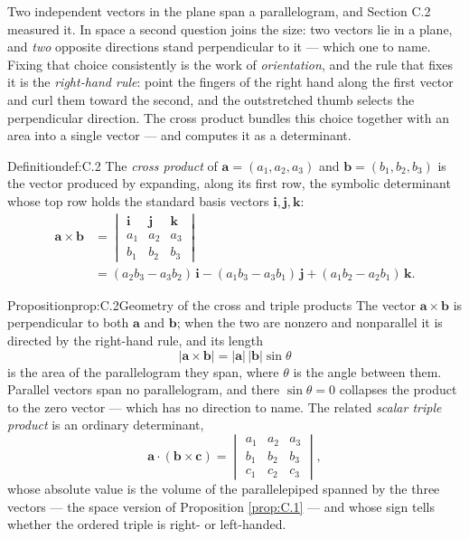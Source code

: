 \documentclass[a4paper,12pt,oneside]{memoir}
\begin{document}
Two independent vectors in the plane span a parallelogram, and Section C.2 measured it. In space a second question joins the size: two vectors lie in a plane, and \emph{two} opposite directions stand perpendicular to it — which one to name. Fixing that choice consistently is the work of \emph{orientation}, and the rule that fixes it is the \emph{right-hand rule}: point the fingers of the right hand along the first vector and curl them toward the second, and the outstretched thumb selects the perpendicular direction. The cross product bundles this choice together with an area into a single vector — and computes it as a determinant.

\begin{envdefinition}{Definition}{def:C.2}{}
The \emph{cross product} of \(\mathbf{a} = (a_1, a_2, a_3)\) and \(\mathbf{b} = (b_1, b_2, b_3)\) is the vector produced by expanding, along its first row, the symbolic determinant whose top row holds the standard basis vectors \(\mathbf{i}, \mathbf{j}, \mathbf{k}\): \[ \begin{aligned}
        \mathbf{a} \times \mathbf{b}
          &= \begin{vmatrix} \mathbf{i} & \mathbf{j} & \mathbf{k} \\ a_1 & a_2 & a_3 \\ b_1 & b_2 & b_3 \end{vmatrix} \\[2pt]
          &= (a_2 b_3 - a_3 b_2)\,\mathbf{i} - (a_1 b_3 - a_3 b_1)\,\mathbf{j} + (a_1 b_2 - a_2 b_1)\,\mathbf{k}.
      \end{aligned} \]
\end{envdefinition}
\begin{envproposition}{Proposition}{prop:C.2}{Geometry of the cross and triple products}
The vector \(\mathbf{a} \times \mathbf{b}\) is perpendicular to both \(\mathbf{a}\) and \(\mathbf{b}\); when the two are nonzero and nonparallel it is directed by the right-hand rule, and its length \[ |\mathbf{a} \times \mathbf{b}| = |\mathbf{a}|\,|\mathbf{b}|\sin\theta \] is the area of the parallelogram they span, where \(\theta\) is the angle between them. Parallel vectors span no parallelogram, and there \(\sin\theta = 0\) collapses the product to the zero vector — which has no direction to name. The related \emph{scalar triple product} is an ordinary determinant, \[ \mathbf{a} \cdot (\mathbf{b} \times \mathbf{c}) = \begin{vmatrix} a_1 & a_2 & a_3 \\ b_1 & b_2 & b_3 \\ c_1 & c_2 & c_3 \end{vmatrix}, \] whose absolute value is the volume of the parallelepiped spanned by the three vectors — the space version of Proposition \ref{prop:C.1} — and whose sign tells whether the ordered triple is right- or left-handed.
\end{envproposition}
\end{document}
